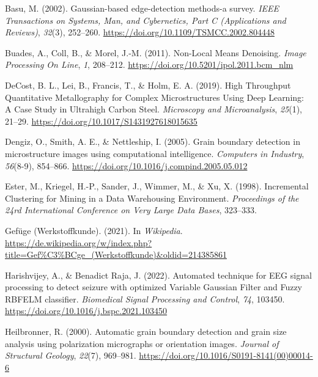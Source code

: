 \documentclass[
  12pt,
]{book}
\newlength{\cslhangindent}
\newlength{\cslentryspacingunit} %
\newenvironment{CSLReferences}[2] %
 {%
  \setlength{\parindent}{0pt}
  \ifodd #1
  \let\oldpar\par
  \def\par{\hangindent=\cslhangindent\oldpar}
  \fi
  \setlength{\parskip}{#2\cslentryspacingunit}
 }%
 {}
\begin{document}
\begin{CSLReferences}{1}{0}
\leavevmode{}%
Basu, M. (2002). Gaussian-based edge-detection methods-a survey. \emph{IEEE Transactions on Systems, Man, and Cybernetics, Part C (Applications and Reviews)}, \emph{32}(3), 252--260. \url{https://doi.org/10.1109/TSMCC.2002.804448}

\leavevmode{}%
Buades, A., Coll, B., \& Morel, J.-M. (2011). Non-{Local Means Denoising}. \emph{Image Processing On Line}, \emph{1}, 208--212. \url{https://doi.org/10.5201/ipol.2011.bcm_nlm}

\leavevmode{}%
DeCost, B. L., Lei, B., Francis, T., \& Holm, E. A. (2019). High {Throughput Quantitative Metallography} for {Complex Microstructures Using Deep Learning}: {A Case Study} in {Ultrahigh Carbon Steel}. \emph{Microscopy and Microanalysis}, \emph{25}(1), 21--29. \url{https://doi.org/10.1017/S1431927618015635}

\leavevmode{}%
Dengiz, O., Smith, A. E., \& Nettleship, I. (2005). Grain boundary detection in microstructure images using computational intelligence. \emph{Computers in Industry}, \emph{56}(8-9), 854--866. \url{https://doi.org/10.1016/j.compind.2005.05.012}

\leavevmode{}%
Ester, M., Kriegel, H.-P., Sander, J., Wimmer, M., \& Xu, X. (1998). Incremental {Clustering} for {Mining} in a {Data Warehousing Environment}. \emph{Proceedings of the 24rd {International Conference} on {Very Large Data Bases}}, 323--333.

\leavevmode{}%
Gefüge (Werkstoffkunde). (2021). In \emph{Wikipedia}. \url{https://de.wikipedia.org/w/index.php?title=Gef\%C3\%BCge_(Werkstoffkunde)\&oldid=214385861}

\leavevmode{}%
Harishvijey, A., \& Benadict Raja, J. (2022). Automated technique for {EEG} signal processing to detect seizure with optimized {Variable Gaussian Filter} and {Fuzzy RBFELM} classifier. \emph{Biomedical Signal Processing and Control}, \emph{74}, 103450. \url{https://doi.org/10.1016/j.bspc.2021.103450}

\leavevmode{}%
Heilbronner, R. (2000). Automatic grain boundary detection and grain size analysis using polarization micrographs or orientation images. \emph{Journal of Structural Geology}, \emph{22}(7), 969--981. \url{https://doi.org/10.1016/S0191-8141(00)00014-6}


\end{CSLReferences}
\end{document}
